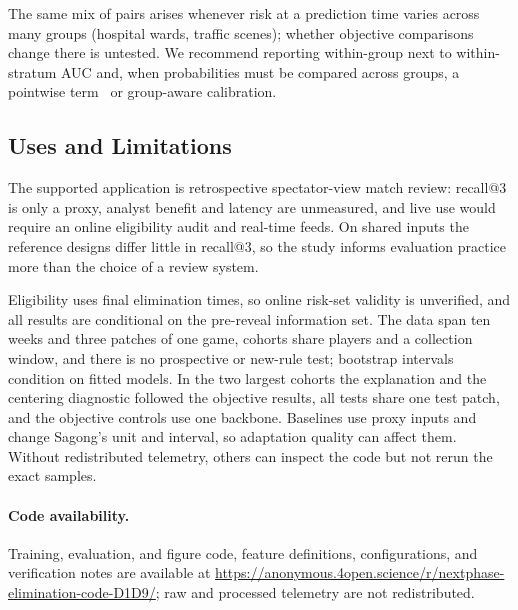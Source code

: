 \documentclass[sigconf,anonymous]{acmart}
\newcommand{\artifacturl}{\url{https://anonymous.4open.science/r/nextphase-elimination-code-D1D9/}}
\begin{document}
The same mix of pairs arises whenever risk at a prediction time varies across many groups (hospital wards, traffic scenes); whether objective comparisons change there is untested. We recommend reporting within-group next to within-stratum AUC and, when probabilities must be compared across groups, a pointwise term~\cite{Bai23} or group-aware calibration.

\subsection{Uses and Limitations}
\label{sec:discussion:limits}
The supported application is retrospective spectator-view match review: recall@3 is only a proxy, analyst benefit and latency are unmeasured, and live use would require an online eligibility audit and real-time feeds. On shared inputs the reference designs differ little in recall@3, so the study informs evaluation practice more than the choice of a review system.

Eligibility uses final elimination times, so online risk-set validity is unverified, and all results are conditional on the pre-reveal information set. The data span ten weeks and three patches of one game, cohorts share players and a collection window, and there is no prospective or new-rule test; bootstrap intervals condition on fitted models. In the two largest cohorts the explanation and the centering diagnostic followed the objective results, all tests share one test patch, and the objective controls use one backbone. Baselines use proxy inputs and change Sagong's unit and interval, so adaptation quality can affect them. Without redistributed telemetry, others can inspect the code but not rerun the exact samples.

\paragraph{Code availability.}
Training, evaluation, and figure code, feature definitions, configurations, and verification notes are available at \artifacturl{}; raw and processed telemetry are not redistributed.
\end{document}

